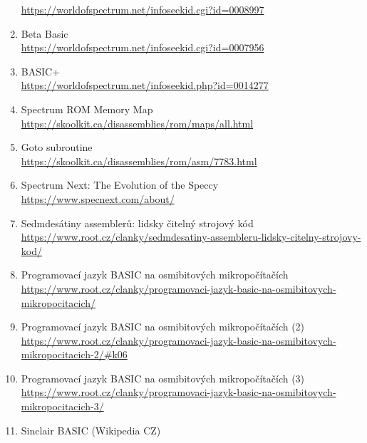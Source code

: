 \documentclass{article}
\begin{document}
\begin{enumerate}
  \href{https://worldofspectrum.net/infoseekid.cgi?id=0008997}{https://worldofspectrum.net/in­foseekid.cgi?id=0008997}
\item
  Beta Basic\\
  \href{https://worldofspectrum.net/infoseekid.cgi?id=0007956}{https://worldofspectrum.net/in­foseekid.cgi?id=0007956}
\item
  BASIC+\\
  \href{https://worldofspectrum.net/infoseekid.php?id=0014277}{https://worldofspectrum.net/in­foseekid.php?id=0014277}
\item
  Spectrum ROM Memory Map\\
  \href{https://skoolkit.ca/disassemblies/rom/maps/all.html}{https://skoolkit.ca/disas­semblies/rom/maps/all.html}
\item
  Goto subroutine\\
  \href{https://skoolkit.ca/disassemblies/rom/asm/7783.html}{https://skoolkit.ca/disas­semblies/rom/asm/7783.html}
\item
  Spectrum Next: The Evolution of the Speccy\\
  \url{https://www.specnext.com/about/}
\item
  Sedmdesátiny assemblerů: lidsky čitelný strojový kód\\
  \href{https://www.root.cz/clanky/sedmdesatiny-assembleru-lidsky-citelny-strojovy-kod/}{https://www.root.cz/clanky/sed­mdesatiny-assembleru-lidsky-citelny-strojovy-kod/}
\item
  Programovací jazyk BASIC na osmibitových mikropočítačích\\
  \href{https://www.root.cz/clanky/programovaci-jazyk-basic-na-osmibitovych-mikropocitacich/}{https://www.root.cz/clanky/pro­gramovaci-jazyk-basic-na-osmibitovych-mikropocitacich/}
\item
  Programovací jazyk BASIC na osmibitových mikropočítačích (2)\\
  \href{https://www.root.cz/clanky/programovaci-jazyk-basic-na-osmibitovych-mikropocitacich-2/\#k06}{https://www.root.cz/clanky/pro­gramovaci-jazyk-basic-na-osmibitovych-mikropocitacich-2/\#k06}
\item
  Programovací jazyk BASIC na osmibitových mikropočítačích (3)\\
  \href{https://www.root.cz/clanky/programovaci-jazyk-basic-na-osmibitovych-mikropocitacich-3/}{https://www.root.cz/clanky/pro­gramovaci-jazyk-basic-na-osmibitovych-mikropocitacich-3/}
\item
  Sinclair BASIC (Wikipedia CZ)\\

\end{enumerate}
\end{document}
